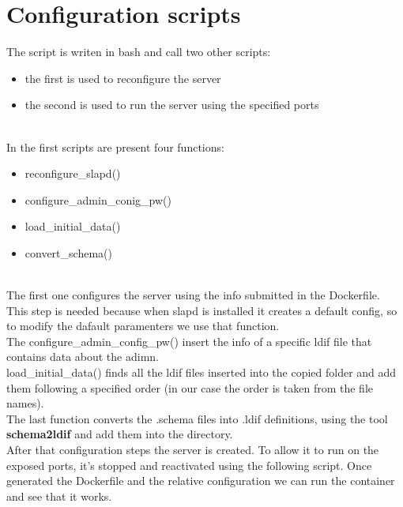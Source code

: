 \section{Configuration scripts}
The script is writen in bash and call two other scripts:
\begin{itemize}
    \item the first is used to reconfigure the server
    \item the second is used to run the server using the specified ports
\end{itemize}
\\
In the first scripts are present four functions:\\
\begin{itemize}
    \item reconfigure\_slapd()
    \item configure\_admin\_conig\_pw()
    \item load\_initial\_data()
    \item convert\_schema()
\end{itemize}
\\
The first one configures the server using the info submitted in the Dockerfile. This step is needed because when slapd is installed it creates a default config, so to modify the dafault paramenters we use that function.
\\
The configure\_admin\_config\_pw() insert the info of a specific ldif file that contains data about the adimn.
\\
load\_initial\_data() finds all the ldif files inserted into the copied folder and add them following a specified order (in our case the order is taken from the file names).
\\
The last function converts the .schema files into  .ldif definitions, using the tool \textbf{schema2ldif} and add them into the directory.
\\
After that configuration steps the server is created. To allow it to run on the exposed ports, it's stopped and reactivated using the following script.
Once generated the Dockerfile and the relative configuration we can run the container and see that it works.
